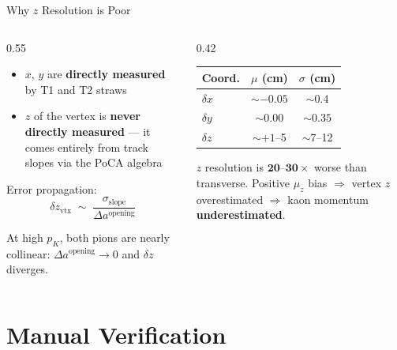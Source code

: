 \documentclass[aspectratio=169,10pt]{beamer}
\begin{document}
\begin{frame}{Why $z$ Resolution is Poor}

\begin{columns}
\begin{column}{0.55\textwidth}
    \begin{itemize}
        \item $x$, $y$ are \textbf{directly measured} by T1 and T2 straws
        \item $z$ of the vertex is \textbf{never directly measured} — it comes entirely from track slopes via the PoCA algebra
    \end{itemize}

    \medskip
    Error propagation:
    \begin{equation*}
        \delta z_\text{vtx} \;\sim\; \frac{\sigma_\text{slope}}{\Delta a^\text{opening}}
    \end{equation*}

    At high $p_K$, both pions are nearly collinear: $\Delta a^\text{opening} \to 0$ and $\delta z$ diverges.
\end{column}
\begin{column}{0.42\textwidth}
    \begin{center}
    \small
    \begin{tabular}{lcc}
        \toprule
        \textbf{Coord.} & $\mu$ (cm) & $\sigma$ (cm) \\
        \midrule
        $\delta x$ & $\sim -0.05$ & $\sim 0.4$ \\
        $\delta y$ & $\sim 0.00$  & $\sim 0.35$ \\
        $\delta z$ & $\sim +1$--5 & $\sim 7$--12 \\
        \bottomrule
    \end{tabular}
    \end{center}

    \medskip
    \small $z$ resolution is $\mathbf{20\text{--}30\times}$ worse than transverse. Positive $\mu_z$ bias $\Rightarrow$ vertex $z$ overestimated $\Rightarrow$ kaon momentum \textbf{underestimated}.
\end{column}
\end{columns}

\end{frame}

\section{Manual Verification}
\end{document}
